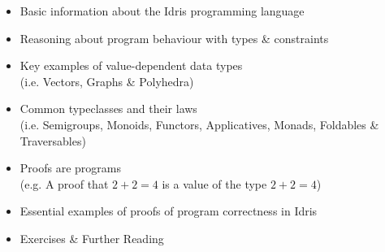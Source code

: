 \begin{itemize}
\item Basic information about the Idris programming language
\item Reasoning about program behaviour with types \& constraints
\item Key examples of value-dependent data types \\
  \small
  (i.e. Vectors, Graphs \& Polyhedra)
  \normalsize
\item Common typeclasses and their laws \\
  \small
  (i.e. Semigroups, Monoids, Functors, Applicatives, Monads, Foldables \& Traversables)
  \normalsize
\item Proofs are programs \\
  \small
  (e.g. A proof that $2 + 2 = 4$ is a value of the type $2 + 2 = 4$)
  \normalsize
\item Essential examples of proofs of program correctness in Idris
\item Exercises \& Further Reading
\end{itemize}
